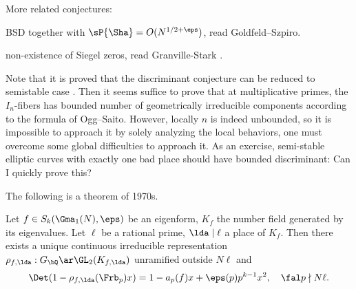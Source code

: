\documentclass[article, a4paper, twoside]{universal}
\begin{document}
\begin{rmk}
	More related conjectures:
	\begin{itm}
		\item BSD together with $\sP{\Sha}=O(N^{1/2+\eps})$, read Goldfeld--Szpiro\cite{GS1995Bounds}.
		\item non-existence of Siegel zeros, read Granville-Stark \cite{GS2000abc}.
	\end{itm}

	Note that it is proved that the discriminant conjecture can be reduced to semistable case \cite[Proposition~8.2]{PS2000}. Then it seems suffice to prove that at multiplicative primes, the $I_{n}$-fibers has bounded number of geometrically irreducible components according to the formula of Ogg--Saito. However, locally $n$ is indeed unbounded, so it is impossible to approach it by solely analyzing the local behaviors, one must overcome some global difficulties to approach it. As an exercise, semi-stable elliptic curves with exactly one bad place should have bounded discriminant: Can I quickly prove this?

\end{rmk}

The following is a theorem of 1970s.
\begin{thm}
	Let $f\in S_{k}(\Gma_{1}(N),\eps)$ be an eigenform, $K_{f}$ the number field generated by its eigenvalues. Let $\ell$ be a rational prime, $\lda\mid \ell$ a place of $K_{f}$. Then there exists a unique continuous irreducible representation $\rho_{f,\lda}:G_{\bQ}\ar\GL_{2}(K_{f,\lda})$ unramified outside $N\ell$ and
	\[
		\Det(1-\rho_{f,\lda}(\Frb_{p})x)=1-a_{p}(f)x+\eps(p)p^{k-1}x^{2},\quad \fal p\nmid N\ell.
	\]
\end{thm}
\end{document}
